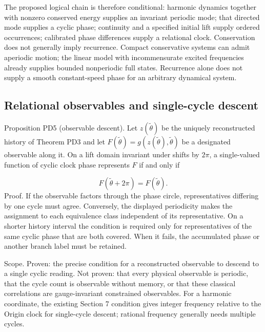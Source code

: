 \documentclass[aip,adv,preprint,floatfix]{revtex4-2}
\begin{document}
The proposed logical chain is therefore conditional: harmonic dynamics together with nonzero conserved energy supplies an invariant periodic mode; that directed mode supplies a cyclic phase; continuity and a specified initial lift supply ordered occurrences; calibrated phase differences supply a relational clock. Conservation does not generally imply recurrence. Compact conservative systems can admit aperiodic motion; the linear model with incommensurate excited frequencies already supplies bounded nonperiodic full states. Recurrence alone does not supply a smooth constant-speed phase for an arbitrary dynamical system.

\subsection*{Relational observables and single-cycle descent}
Proposition PD5 (observable descent). Let $z(\widetilde\theta)$ be the uniquely reconstructed history of Theorem PD3 and let $F(\widetilde\theta)=g(z(\widetilde\theta),\widetilde\theta)$ be a designated observable along it. On a lift domain invariant under shifts by $2\pi$, a single-valued function of cyclic clock phase represents $F$ if and only if

\begin{equation}
F(\widetilde\theta+2\pi)=F(\widetilde\theta).
\end{equation}
Proof. If the observable factors through the phase circle, representatives differing by one cycle must agree. Conversely, the displayed periodicity makes the assignment to each equivalence class independent of its representative. On a shorter history interval the condition is required only for representatives of the same cyclic phase that are both covered. When it fails, the accumulated phase or another branch label must be retained.

Scope. Proven: the precise condition for a reconstructed observable to descend to a single cyclic reading. Not proven: that every physical observable is periodic, that the cycle count is observable without memory, or that these classical correlations are gauge-invariant constrained observables. For a harmonic coordinate, the existing Section 7 condition gives integer frequency relative to the Origin clock for single-cycle descent; rational frequency generally needs multiple cycles.
\end{document}
